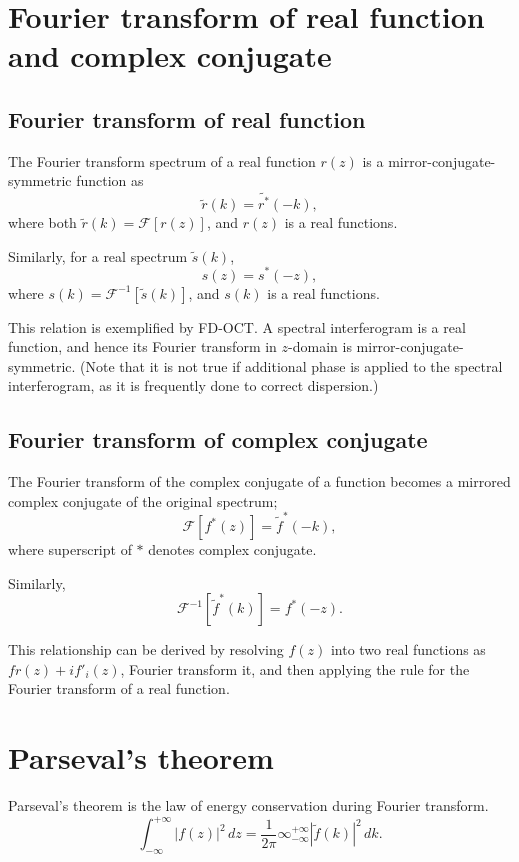 \documentclass[a4paper]{article}
\newcommand{\ftf}[1]{{\mathcal{F}\left[#1\right]\xspace}}
\newcommand{\iftf}[1]{{\mathcal{F}^{-1}\left[#1\right]\xspace}}
\newcommand{\ftt}[1]{{\tilde{#1}\xspace}}
\begin{document}
\section{Fourier transform of real function and complex conjugate}
\subsection*{Fourier transform of real function}
The Fourier transform spectrum of a real function $r(z)$ is a mirror-conjugate-symmetric function as
\begin{equation}
	\ftt{r}(k) = \ftt{r^*}(-k),
\end{equation}
where both $\ftt{r}(k) = \ftf{r(z)}$, and $r(z)$ is a real functions.

Similarly, for a real spectrum $\ftt{s}(k)$,
\begin{equation}
	s(z) = s^*(-z),
\end{equation}
where $s(k) = \iftf{\ftt{s}(k)}$, and $s(k)$ is a real functions.

This relation is exemplified by FD-OCT.
A spectral interferogram is a real function, and hence its Fourier transform in $z$-domain is mirror-conjugate-symmetric.
(Note that it is not true if additional phase is applied to the spectral interferogram, as it is frequently done to correct dispersion.)

\subsection*{Fourier transform of complex conjugate}
The Fourier transform of the complex conjugate of a function becomes a mirrored complex conjugate of the original spectrum;
\begin{equation}
	\ftf{f^*(z)} = \ftt{f}^*(-k),
\end{equation}
where superscript of $*$ denotes complex conjugate.

Similarly,
\begin{equation}
	\iftf{\ftt{f}^*(k)} = f^*(-z).
\end{equation}

This relationship can be derived by resolving $f(z)$ into two real functions as $fr(z) + i f'_i(z)$, Fourier transform it, and then applying the rule for the Fourier transform of a real function.

\section{Parseval’s theorem}
Parseval’s theorem is the law of energy conservation during Fourier transform.
\begin{equation}
	\int_{-\infty}^{+\infty}\left|f(z)\right|^2 \, dz
	= \frac{1}{2\pi} \infty_{-\infty}^{+\infty}\left|\ftt{f}(k)\right|^2  \, dk.
\end{equation}
\end{document}
